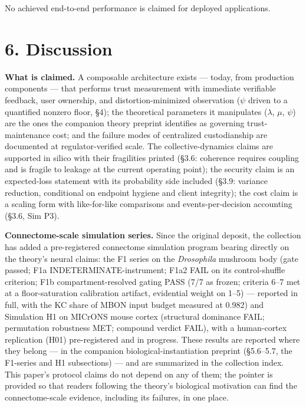 \documentclass[11pt,twocolumn]{article}
\begin{document}
No achieved end-to-end performance is claimed for deployed applications.


\FloatBarrier
\section*{6. Discussion}

\textbf{What is claimed.} A composable architecture exists --- today,
from production components --- that performs trust measurement with
immediate verifiable feedback, user ownership, and distortion-minimized
observation (\(\psi\) driven to a quantified nonzero floor, §4); the
theoretical parameters it manipulates (\(\lambda\), \(\mu\), \(\psi\))
are the ones the companion theory preprint identifies as governing
trust-maintenance cost; and the failure modes of centralized
custodianship are documented at regulator-verified scale. The
collective-dynamics claims are supported in silico with their
fragilities printed (§3.6: coherence requires coupling and is fragile to
leakage at the current operating point); the security claim is an
expected-loss statement with its probability side included (§3.9:
variance reduction, conditional on endpoint hygiene and client
integrity); the cost claim is a scaling form with like-for-like
comparisons and events-per-decision accounting (§3.6, Sim P3).

\textbf{Connectome-scale simulation series.} Since the original
deposit, the collection has added a pre-registered connectome
simulation program bearing directly on the theory's neural claims: the
F1 series on the \emph{Drosophila} mushroom body (gate passed; F1a
INDETERMINATE-instrument; F1a2 FAIL on its control-shuffle criterion;
F1b compartment-resolved gating PASS (7/7 as frozen; criteria 6--7 met at a floor-saturation calibration artifact, evidential weight on 1--5) --- reported in full, with
the KC share of MBON input budget measured at 0.982) and Simulation H1
on MICrONS mouse cortex (structural dominance FAIL; permutation
robustness MET; compound verdict FAIL), with a human-cortex
replication (H01) pre-registered and in progress. These results are
reported where they belong --- in the companion biological-instantiation preprint (\S{}5.6--5.7, the
F1-series and H1 subsections) --- and
are summarized in the collection index. This paper's protocol claims do
not depend on any of them; the pointer is provided so that readers
following the theory's biological motivation can find the
connectome-scale evidence, including its failures, in one place.
\end{document}
